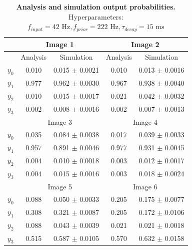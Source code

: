 \begin{table}[]
\centering
\label{tab:1D_42_222_15}
\small
\tabcolsep=0.11cm
\begin{tabular}{|c|cc|cc|}
\hline
                       & \multicolumn{2}{c|}{Image 1}                       & \multicolumn{2}{c|}{Image 2}                       \\ \hline
                       & \multicolumn{1}{c|}{Analysis} & Simulation         & \multicolumn{1}{c|}{Analysis} & Simulation         \\ \hline
$y_0$                  & \multicolumn{1}{c|}{0.010}    & 0.015 $\pm$ 0.0021 & \multicolumn{1}{c|}{0.010}    & 0.013 $\pm$ 0.0016 \\ \hline
$y_1$                  & \multicolumn{1}{c|}{0.977}    & 0.962 $\pm$ 0.0030 & \multicolumn{1}{c|}{0.967}    & 0.938 $\pm$ 0.0040 \\ \hline
$y_2$                  & \multicolumn{1}{c|}{0.010}    & 0.015 $\pm$ 0.0017 & \multicolumn{1}{c|}{0.021}    & 0.042 $\pm$ 0.0032 \\ \hline
$y_3$                  & \multicolumn{1}{c|}{0.002}    & 0.008 $\pm$ 0.0016 & \multicolumn{1}{c|}{0.002}    & 0.007 $\pm$ 0.0013 \\ \hline
                       & \multicolumn{2}{c|}{Image 3}                       & \multicolumn{2}{c|}{Image 4}                       \\ \hline
$y_0$                  & \multicolumn{1}{c|}{0.035}    & 0.084 $\pm$ 0.0038 & \multicolumn{1}{c|}{0.017}    & 0.039 $\pm$ 0.0033 \\ \hline
$y_1$                  & \multicolumn{1}{c|}{0.957}    & 0.891 $\pm$ 0.0046 & \multicolumn{1}{c|}{0.977}    & 0.931 $\pm$ 0.0045 \\ \hline
$y_2$                  & \multicolumn{1}{c|}{0.004}    & 0.010 $\pm$ 0.0018 & \multicolumn{1}{c|}{0.003}    & 0.012 $\pm$ 0.0017 \\ \hline
$y_3$                  & \multicolumn{1}{c|}{0.004}    & 0.015 $\pm$ 0.0016 & \multicolumn{1}{c|}{0.003}    & 0.018 $\pm$ 0.0024 \\ \hline
						& \multicolumn{2}{c|}{Image 5}                       & \multicolumn{2}{c|}{Image 6}                       \\ \hline
$y_0$                  & \multicolumn{1}{c|}{0.088}    & 0.050 $\pm$ 0.0033 & \multicolumn{1}{c|}{0.205}    & 0.175 $\pm$ 0.0077 \\ \hline
$y_1$                  & \multicolumn{1}{c|}{0.308}    & 0.321 $\pm$ 0.0087 & \multicolumn{1}{c|}{0.205}    & 0.172 $\pm$ 0.0106 \\ \hline
$y_2$                  & \multicolumn{1}{c|}{0.088}    & 0.043 $\pm$ 0.0039 & \multicolumn{1}{c|}{0.021}    & 0.021 $\pm$ 0.0018 \\ \hline
$y_3$                  & \multicolumn{1}{c|}{0.515}    & 0.587 $\pm$ 0.0105 & \multicolumn{1}{c|}{0.570}    & 0.632 $\pm$ 0.0158 \\ \hline
\end{tabular}
\caption{\textbf{Analysis and simulation output probabilities. } Hyperparameters: $f_{input} = 42\text{ Hz}, f_{prior} = 222\text{ Hz}, \tau_{decay} = 15\text{ ms}$}
\end{table}
